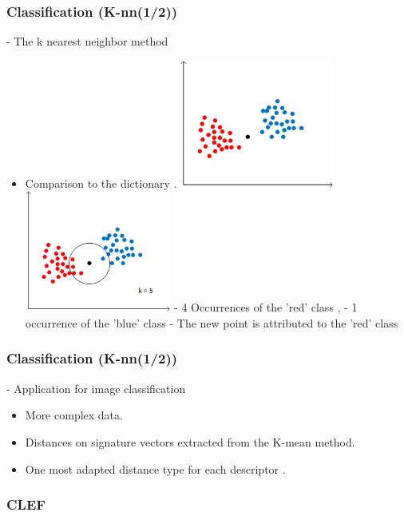 \documentclass[xcolor=table]{beamer}
\begin{document}
\begin{frame}\frametitle{Classification (K-nn(1/2))}

- The k nearest neighbor method

\begin{itemize}
\item<1-> Comparison to the dictionary .
 {\includegraphics[height=4.2cm]{knnwc.png}} %
 {\includegraphics[height=4cm]{knnac.png}
\newline - 4 Occurrences of the 'red' class , - 1 occurrence of the 'blue' class \newline - The new point is attributed to the 'red' class}
\end{itemize}

\end{frame}

\begin{frame}\frametitle{Classification (K-nn(1/2))}

- Application for image classification

\begin{itemize}
\item More complex data.
\item Distances on signature vectors extracted from the K-mean method.
\item One most adapted distance type for each descriptor .
\end{itemize}

\end{frame}



\begin{frame} \frametitle{CLEF}

\end{frame}
\end{document}
